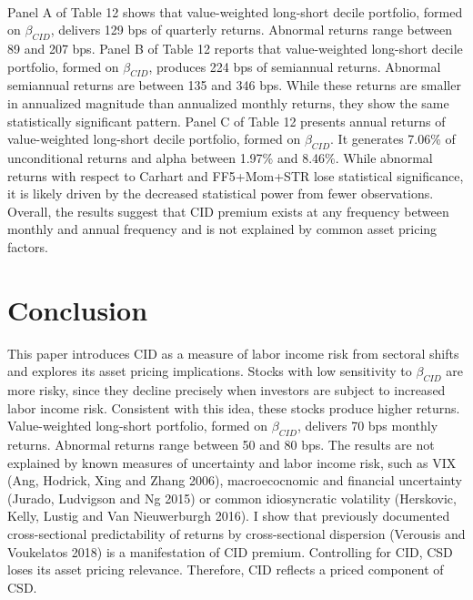 \documentclass[12pt]{article}
\begin{document}
\paragraph{}
Panel A of Table 12 shows that value-weighted long-short decile portfolio, formed on $\beta_{CID}$, delivers 129 bps of quarterly returns. Abnormal returns range between 89 and 207 bps. Panel B of Table 12 reports that value-weighted long-short decile portfolio, formed on $\beta_{CID}$, produces 224 bps of semiannual returns. Abnormal semiannual returns are between 135 and 346 bps. While these returns are smaller in annualized magnitude than annualized monthly returns, they show the same statistically significant pattern. Panel C of Table 12 presents annual returns of value-weighted long-short decile portfolio, formed on $\beta_{CID}$. It generates 7.06\% of unconditional returns and alpha between 1.97\% and 8.46\%. While abnormal returns with respect to Carhart and FF5+Mom+STR lose statistical significance, it is likely driven by the decreased statistical power from fewer observations. Overall, the results suggest that CID premium exists at any frequency between monthly and annual frequency and is not explained by common asset pricing factors.

\newpage

\section{Conclusion} \label{sec:Model}

This paper introduces CID as a measure of labor income risk from sectoral shifts and explores its asset pricing implications. Stocks with low sensitivity to $\beta_{CID}$ are more risky, since they decline precisely when investors are subject to increased labor income risk. Consistent with this idea, these stocks produce higher returns. Value-weighted long-short portfolio, formed on $\beta_{CID}$, delivers 70 bps monthly returns. Abnormal returns range between 50 and 80 bps. The results are not explained by known measures of uncertainty and labor income risk, such as VIX (Ang, Hodrick, Xing and Zhang 2006), macroecocnomic and financial uncertainty (Jurado, Ludvigson and Ng 2015) or common idiosyncratic volatility (Herskovic, Kelly, Lustig and Van Nieuwerburgh 2016). I show that previously documented cross-sectional predictability of returns by cross-sectional dispersion (Verousis and Voukelatos 2018) is a manifestation of CID premium. Controlling for CID, CSD loses its asset pricing relevance. Therefore, CID reflects a priced component of CSD.
\end{document}
